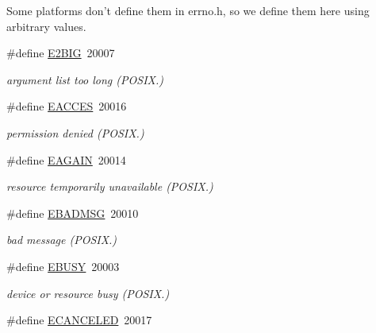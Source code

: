 Some platforms don't define them in errno.\-h, so we define them here using arbitrary values. \begin{DoxyCompactItemize}
\item 
\hypertarget{group__hal_gaba8481985c201ff726f349d7f2d09895}{\#define \hyperlink{group__hal_gaba8481985c201ff726f349d7f2d09895}{E2\-B\-I\-G}~20007}\label{group__hal_gaba8481985c201ff726f349d7f2d09895}

\begin{DoxyCompactList}\small\item\em argument list too long (P\-O\-S\-I\-X.) \end{DoxyCompactList}\item 
\hypertarget{group__hal_gac2a2e9fa555401f94478f74e01868032}{\#define \hyperlink{group__hal_gac2a2e9fa555401f94478f74e01868032}{E\-A\-C\-C\-E\-S}~20016}\label{group__hal_gac2a2e9fa555401f94478f74e01868032}

\begin{DoxyCompactList}\small\item\em permission denied (P\-O\-S\-I\-X.) \end{DoxyCompactList}\item 
\hypertarget{group__hal_gaf0fac1cea1165b4debec7f686edf3313}{\#define \hyperlink{group__hal_gaf0fac1cea1165b4debec7f686edf3313}{E\-A\-G\-A\-I\-N}~20014}\label{group__hal_gaf0fac1cea1165b4debec7f686edf3313}

\begin{DoxyCompactList}\small\item\em resource temporarily unavailable (P\-O\-S\-I\-X.) \end{DoxyCompactList}\item 
\hypertarget{group__hal_ga251e9b536ed96ccb16aa28ca2d5bd656}{\#define \hyperlink{group__hal_ga251e9b536ed96ccb16aa28ca2d5bd656}{E\-B\-A\-D\-M\-S\-G}~20010}\label{group__hal_ga251e9b536ed96ccb16aa28ca2d5bd656}

\begin{DoxyCompactList}\small\item\em bad message (P\-O\-S\-I\-X.) \end{DoxyCompactList}\item 
\hypertarget{group__hal_ga8368025077a0385849d6817b2007c095}{\#define \hyperlink{group__hal_ga8368025077a0385849d6817b2007c095}{E\-B\-U\-S\-Y}~20003}\label{group__hal_ga8368025077a0385849d6817b2007c095}

\begin{DoxyCompactList}\small\item\em device or resource busy (P\-O\-S\-I\-X.) \end{DoxyCompactList}\item 
\hypertarget{group__hal_ga9532d840ef91fd8e1ecc5d7ca7cbf212}{\#define \hyperlink{group__hal_ga9532d840ef91fd8e1ecc5d7ca7cbf212}{E\-C\-A\-N\-C\-E\-L\-E\-D}~20017}\label{group__hal_ga9532d840ef91fd8e1ecc5d7ca7cbf212}


\end{DoxyCompactItemize}
